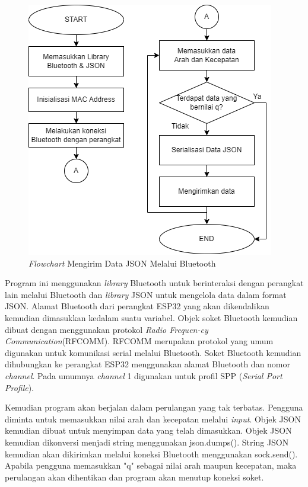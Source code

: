 \begin{figure} [ht] \centering
  \includegraphics[scale=0.7]{gambar/program/11. Mengirim Data JSON Bluetooth.png}
  \caption{\emph{Flowchart} Mengirim Data JSON Melalui Bluetooth}
  \label{fig:Flowchart 11 Mengirim JSON Bluetooth}
\end{figure}

Program ini menggunakan \emph{library} Bluetooth untuk berinteraksi dengan perangkat lain melalui Bluetooth dan \emph{library} JSON untuk mengelola data dalam format JSON. Alamat Bluetooth dari perangkat ESP32 yang akan dikendalikan kemudian dimasukkan kedalam suatu variabel. Objek soket Bluetooth kemudian dibuat dengan menggunakan protokol \emph{Radio Frequen-cy Communication}(RFCOMM). RFCOMM merupakan protokol yang umum digunakan untuk komunikasi serial melalui Bluetooth. Soket Bluetooth kemudian dihubungkan ke perangkat ESP32 menggunakan alamat Bluetooth dan nomor \emph{channel}. Pada umumnya \emph{channel} 1 digunakan untuk profil SPP (\emph{Serial Port Profile}).

Kemudian program akan berjalan dalam perulangan yang tak terbatas. Pengguna diminta untuk memasukkan nilai arah dan kecepatan melalui \emph{input}. Objek JSON kemudian dibuat untuk menyimpan data yang telah dimasukkan. Objek JSON kemudian dikonversi menjadi string menggunakan json.dumps(). String JSON kemudian akan dikirimkan melalui koneksi Bluetooth menggunakan sock.send(). Apabila pengguna memasukkan "q" sebagai nilai arah maupun kecepatan, maka perulangan akan dihentikan dan program akan menutup koneksi soket.

